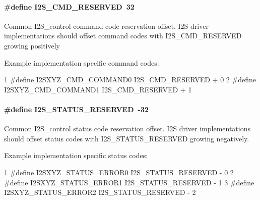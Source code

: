 \paragraph[{I2\+S\+\_\+\+C\+M\+D\+\_\+\+R\+E\+S\+E\+R\+V\+E\+D}]{\setlength{\rightskip}{0pt plus 5cm}\#define I2\+S\+\_\+\+C\+M\+D\+\_\+\+R\+E\+S\+E\+R\+V\+E\+D~32}\label{group___i2_s___c_o_n_t_r_o_l_gaf919ac4341fca59988c28e16058fa819}
Common I2\+S\+\_\+control command code reservation offset. I2\+S driver implementations should offset command codes with I2\+S\+\_\+\+C\+M\+D\+\_\+\+R\+E\+S\+E\+R\+V\+E\+D growing positively

Example implementation specific command codes\+: 
\begin{DoxyCode}
1 #define I2SXYZ\_CMD\_COMMAND0     I2S\_CMD\_RESERVED + 0
2 #define I2SXYZ\_CMD\_COMMAND1     I2S\_CMD\_RESERVED + 1
\end{DoxyCode}
\paragraph[{I2\+S\+\_\+\+S\+T\+A\+T\+U\+S\+\_\+\+R\+E\+S\+E\+R\+V\+E\+D}]{\setlength{\rightskip}{0pt plus 5cm}\#define I2\+S\+\_\+\+S\+T\+A\+T\+U\+S\+\_\+\+R\+E\+S\+E\+R\+V\+E\+D~-\/32}\label{group___i2_s___c_o_n_t_r_o_l_ga3fad4fcf6773f3c5946c4881631f838d}
Common I2\+S\+\_\+control status code reservation offset. I2\+S driver implementations should offset status codes with I2\+S\+\_\+\+S\+T\+A\+T\+U\+S\+\_\+\+R\+E\+S\+E\+R\+V\+E\+D growing negatively.

Example implementation specific status codes\+: 
\begin{DoxyCode}
1 #define I2SXYZ\_STATUS\_ERROR0    I2S\_STATUS\_RESERVED - 0
2 #define I2SXYZ\_STATUS\_ERROR1    I2S\_STATUS\_RESERVED - 1
3 #define I2SXYZ\_STATUS\_ERROR2    I2S\_STATUS\_RESERVED - 2
\end{DoxyCode}
 